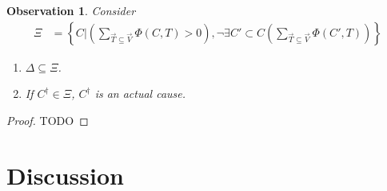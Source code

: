 \documentclass{article}
\newtheorem{observation}[theorem]{Observation}
\begin{document}
\pagebreak 

\begin{observation} Consider 
\begin{align*}\Xi & = \left\{C \vert \left(\sum_{\vec{T} \subseteq \vec{V}} \Phi(C, T)>0\right),  \neg \exists C' \subset C \left( \sum_{\vec{T} \subseteq \vec{V}} \Phi(C', T)\right) \right\}
\end{align*}

\begin{enumerate} 
\item $\Delta \subseteq \Xi$.
\item If $C^\dagger \in \Xi$, $C^\dagger$ is an actual cause. 
\end{enumerate}
\end{observation}



\begin{proof}
TODO
\end{proof}




















\section{Discussion}
\end{document}
